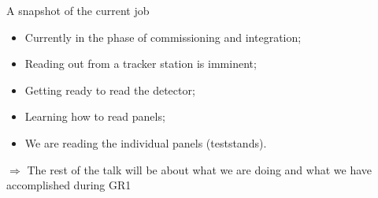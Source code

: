 \documentclass{beamer}[10pt]
\begin{document}
\begin{frame}{A snapshot of the current job}
\vspace{-3mm}
\begin{itemize}
\item Currently in the phase of commissioning and integration;
\vspace{3mm}
\item Reading out from a tracker station is imminent;
\vspace{3mm}
\item Getting ready to read the detector;
\vspace{3mm}
\item Learning how to read panels;
\vspace{3mm}
\item We are reading the individual panels (teststands).
\vspace{5mm}
\end{itemize}
$\Rightarrow$ The rest of the talk will be about what we are doing and what we have accomplished during GR1
\end{frame}
\end{document}
